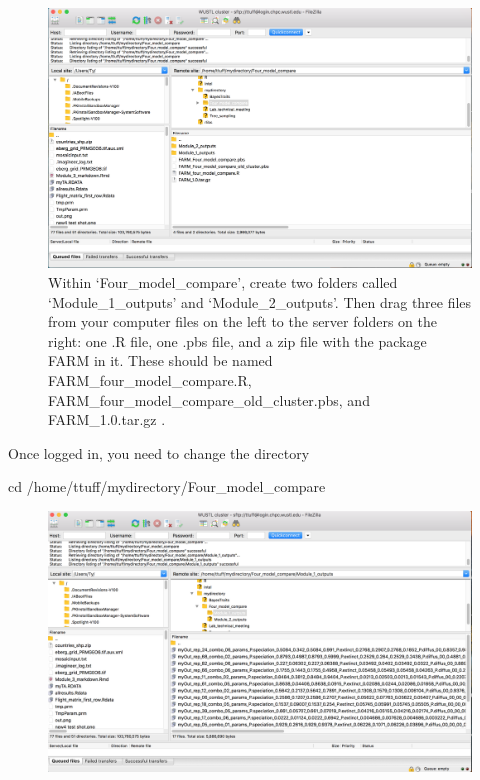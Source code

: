 \documentclass[]{book}
\newenvironment{Shaded}{\begin{snugshade}}{\end{snugshade}}
\newcommand{\BuiltInTok}[1]{{#1}}
\newcommand{\NormalTok}[1]{{#1}}
\theoremstyle{definition}
\theoremstyle{definition}
\theoremstyle{definition}
\theoremstyle{remark}
\begin{document}
\begin{figure}
\centering
\includegraphics{Create module folders.png}
\caption{Within `Four\_model\_compare', create two folders called
`Module\_1\_outputs' and `Module\_2\_outputs'. Then drag three files
from your computer files on the left to the server folders on the right:
one .R file, one .pbs file, and a zip file with the package FARM in it.
These should be named FARM\_four\_model\_compare.R,
FARM\_four\_model\_compare\_old\_cluster.pbs, and FARM\_1.0.tar.gz .}
\end{figure}

Once logged in, you need to change the directory

\begin{Shaded}
\begin{Highlighting}[]
\BuiltInTok{cd}\NormalTok{ /home/ttuff/mydirectory/Four_model_compare}
\end{Highlighting}
\end{Shaded}

\begin{figure}
\centering
\includegraphics{Files from module 1.png}
\caption{}
\end{figure}
\end{document}
